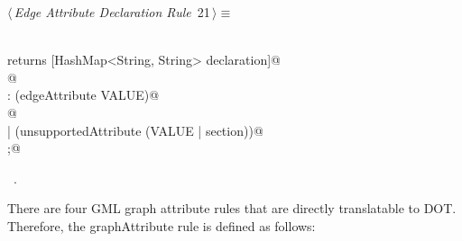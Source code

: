 \documentclass[a4paper]{report}
\begin{document}
\begin{flushleft} \small
\begin{minipage}{\linewidth}\label{scrap21}\raggedright\small
{} $\langle\,${\itshape Edge Attribute Declaration Rule}\nobreak\ {\footnotesize {21}}$\,\rangle\equiv$
\vspace{-1ex}
\begin{list}{}{} \item
\mbox{}\verb@@\\
\mbox{}\verb@edgeAttrDeclaration returns [HashMap<String, String> declaration]@\\
\mbox{}@\\
\mbox{}\verb@: (edgeAttribute VALUE)@\\
\mbox{}@\\
\mbox{}\verb@| (unsupportedAttribute (VALUE | section))@\\
\mbox{};@\\
\mbox{}\verb@@{\NWsep}
\end{list}
\vspace{-1.5ex}
\footnotesize
\begin{list}{}{\setlength{\itemsep}{-\parsep}\setlength{\itemindent}{-\leftmargin}}
\item \NWtxtMacroRefIn\ .

\item{}
\end{list}
\end{minipage}\vspace{4ex}
\end{flushleft}
There are four GML graph attribute rules that are directly translatable to DOT. Therefore, the graphAttribute rule is defined as follows:
\end{document}
